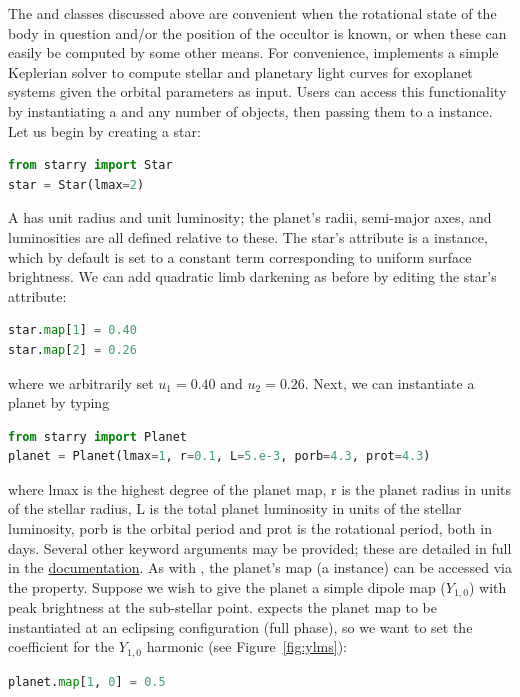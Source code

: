 \documentclass[modern]{aastex61}
\begin{document}
The \starryMap and \starryLimbDarkenedMap classes
discussed above are convenient when the rotational
state of the body in question and/or the position of the occultor is known,
or when these can easily be computed by some other means. For convenience,
\starry implements a simple Keplerian solver to compute stellar and
planetary light curves for exoplanet systems given the orbital parameters as
input. Users can access this functionality by instantiating a
\starryStar and any number of \starryPlanet objects, then
passing them to a \starrySystem instance. Let us begin by
creating a star:
%
\begin{lstlisting}[language=Python,firstnumber=last]
from starry import Star
star = Star(lmax=2)
\end{lstlisting}
%
A \starryStar has unit radius and unit luminosity; the planet's radii,
semi-major axes, and luminosities are all defined relative to these.
The star's \ldmap attribute is a \starryLimbDarkenedMap instance,
which by default is set to a constant term corresponding to uniform surface brightness.
We can add quadratic limb darkening as before by editing the star's \ldmap
attribute:
%
\begin{lstlisting}[language=Python,firstnumber=last,]
star.map[1] = 0.40
star.map[2] = 0.26
\end{lstlisting}
%
where we arbitrarily set $u_1 = 0.40$ and $u_2 = 0.26$.
Next, we can instantiate a planet by typing
%
\begin{lstlisting}[language=Python,firstnumber=last]
from starry import Planet
planet = Planet(lmax=1, r=0.1, L=5.e-3, porb=4.3, prot=4.3)
\end{lstlisting}
%
where \textsf{lmax} is the highest degree of the planet map, \textsf{r} is the
planet radius in units of the stellar radius, \textsf{L} is the total planet luminosity
in units of the stellar luminosity,
\textsf{porb} is the orbital period and \textsf{prot} is the rotational
period, both in days.
Several other keyword arguments may be provided; these are detailed in full
in the \href{https://rodluger.github.io/starry/starry.html\#starry.Planet}{documentation}.
As with \starryStar, the planet's map
(a \starryMap instance) can be accessed
via the \ldmap property. Suppose we wish to give the planet a simple
dipole map ($Y_{1,0}$) with peak brightness at the sub-stellar point.
\starry expects the planet map to be instantiated at an eclipsing
configuration (full phase), so we want to set the coefficient for the $Y_{1,0}$
harmonic (see Figure~\ref{fig:ylms}):
%
\begin{lstlisting}[language=Python,firstnumber=last]
planet.map[1, 0] = 0.5
\end{lstlisting}
\end{document}
